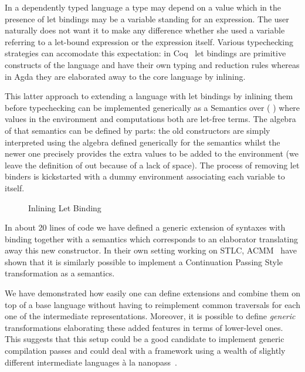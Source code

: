 In a dependently typed language a type may depend on a value which
in the presence of let bindings may be a variable standing for an
expression. The user naturally does not want it to make any difference
whether she used a variable referring to a let-bound expression or
the expression itself. Various typechecking strategies can accomodate
this expectation: in Coq~\cite{Coq:manual} let bindings are primitive
constructs of the language and have their own typing and reduction
rules whereas in Agda they are elaborated away to the core language
by inlining.

This latter approach to extending a language  with let bindings
by inlining them before typechecking can be implemented generically as
a Semantics over (  ) where values in the environment and
computations both are let-free terms. The algebra of that semantics can
be defined by parts: the old constructors are simply interpreted using
the algebra defined generically for the  semantics whilst
the newer one precisely provides the extra values to be added to the
environment (we leave the definition of  out because of a lack
of space). The process of removing let binders is kickstarted with a
dummy environment associating each variable to itself.

\begin{figure}[h]
\begin{minipage}{0.45\textwidth}
\end{minipage}\hspace{2em}
\begin{minipage}{0.45\textwidth}
\end{minipage}
\caption{Inlining Let Binding}
\end{figure}

In about 20 lines of code we have defined a generic extension of
syntaxes with binding together with a semantics which corresponds
to an elaborator translating away this new constructor. In their
own setting working on STLC, ACMM~\citeyear{allais2017type} have shown that it is similarly
possible to implement a Continuation Passing Style transformation as
a semantics.

We have demonstrated how easily one can define extensions and combine
them on top of a base language without having to reimplement common
traversals for each one of the intermediate representations. Moreover,
it is possible to define \emph{generic} transformations elaborating
these added features in terms of lower-level ones. This suggests that
this setup could be a good candidate to implement generic compilation
passes and could deal with a framework using a wealth of slightly
different intermediate languages à la nanopass~\cite{Keep:2013:NFC:2544174.2500618}.

